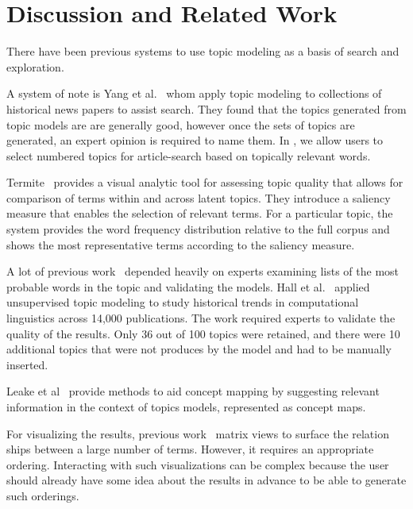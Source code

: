 
\section{Discussion and Related Work}

There have been previous systems to use topic modeling as a basis of
search and exploration. 

A system of note is Yang et al.~\cite{yang2011topic} whom apply topic modeling to 
collections of historical news papers to assist search. They 
found that the topics generated from topic models are 
are generally good, however once the sets of topics are 
generated, an expert opinion is required to name them. 
In \system, we allow users to select numbered topics for article-search 
based on topically relevant words.



Termite~\cite{2012-termite} provides a visual analytic tool for assessing topic quality that allows for comparison of terms within and across latent topics. They introduce a saliency measure that enables the selection of relevant terms. For a particular topic, the system provides the word frequency distribution relative to the full corpus and shows the most representative terms according to the saliency measure.

A lot of previous work~\cite{chang2009reading,mimno2011optimizing,newman2010evaluating} depended heavily on experts examining lists of the most probable words in the topic and validating the models. Hall et al.~\cite{hall2008studying} applied unsupervised topic modeling to study historical trends in computational linguistics across 14,000 publications. The work required experts  to validate the quality of the results. Only 36 out of 100 topics were retained, and there were 10 additional topics that were not produces by the model and had to be manually inserted.

Leake et al~\cite{leake2003topic} provide methods to aid concept mapping by suggesting relevant information in the context of topics models, represented as concept maps. 

For visualizing the results, previous work~\cite{2012-termite,bertin1983semiology,henry2007matlink} matrix views to surface the relation ships between a large number of terms. However, it requires an appropriate ordering. Interacting with such visualizations can be complex because the user should already have some idea about the results in advance to be able to generate such orderings.






